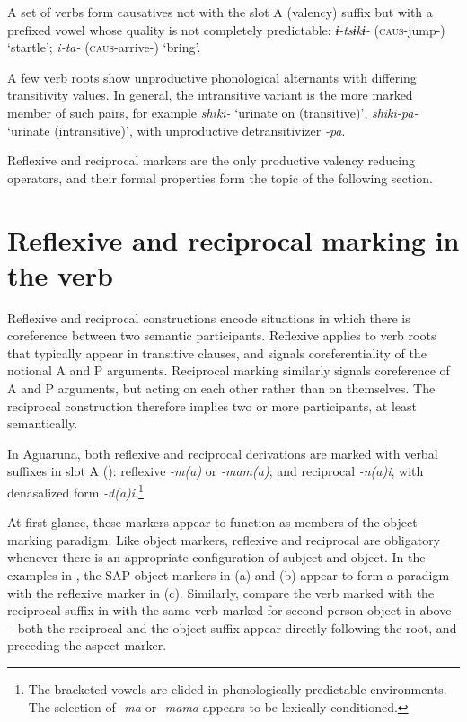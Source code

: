 \documentclass[output=paper]{langscibook}
\begin{document}
A set of verbs form causatives not with the slot
A (valency) suffix but with a prefixed vowel whose quality is not completely predictable: \textit{ɨ-tsɨkɨ-} (\textsc{caus-}jump-) ‘startle’; \textit{i-ta-} (\textsc{caus\nobreakdash-}arrive\nobreakdash-) ‘bring’.

A few verb roots show unproductive phonological alternants with differing transitivity values. In general, the intransitive variant is the more marked member of such pairs, for example \textit{shiki-} ‘urinate on (transitive)’, \textit{shiki-pa-} ‘urinate (intransitive)’, with unproductive detransitivizer \textit{{}-pa}.

Reflexive and reciprocal markers are the only productive valency reducing operators, and their formal properties form the topic of the following section.

\section{Reflexive and reciprocal marking in the verb}
\label{sec:overall:3}

Reflexive and reciprocal constructions encode situations in which there is coreference between two semantic participants. Reflexive applies to verb roots that typically appear in transitive clauses, and signals coreferentiality of the notional A and P arguments. Reciprocal marking similarly signals coreference of A and  P arguments, but acting on each other rather than on themselves. The reciprocal construction therefore implies two or more participants, at least semantically.

In Aguaruna, both reflexive and reciprocal derivations are marked with verbal suffixes in slot A (): reflexive
\textit{{}-m(a)} or \textit{{}-mam(a)}; and reciprocal \textit{{}-n(a)i}, with denasalized form \textit{{}-d(a)i}.\footnote{The bracketed vowels are elided in phonologically predictable environments. The selection of \textit{{}-ma} or \textit{{}-mama} appears to be lexically conditioned.}


At first glance, these markers appear to function as members of the object-marking paradigm. Like object markers, reflexive and reciprocal are obligatory whenever there is an appropriate configuration of subject and object. In the examples in , the SAP object markers in (a) and (b) appear to form a paradigm with the reflexive marker in (c). Similarly, compare the verb marked with the reciprocal suffix in  with the same verb marked for second person object in  above – both the reciprocal and the object suffix appear directly following the root, and preceding the aspect marker.
\end{document}
